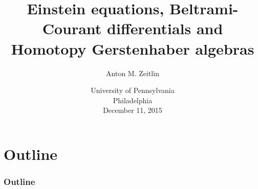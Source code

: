 \documentclass[9pt]{beamer}
\title[Einstein equations, Beltrami-Courant differentials and  Homotopy Gerstenhaber algebras]
{Einstein equations, Beltrami-Courant differentials and  Homotopy Gerstenhaber algebras}
\author[Anton Zeitlin]{Anton M. Zeitlin}
\institute[Columbia]{Columbia University, Department of Mathematics}
\date[2014]{{\tiny University of Pennsylvania}\\
{\tiny Philadelphia}\\
{\tiny December 11, 2015}}
\begin{document}
\section{}
\begin{frame}
\vspace*{10mm}
\titlepage
\vspace*{10mm}
\begin{flushright}
\end{flushright}
\end{frame}


\section*{Outline}
\begin{frame}[t]
\frametitle{Outline}
\tableofcontents
\end{frame}


\end{document}

